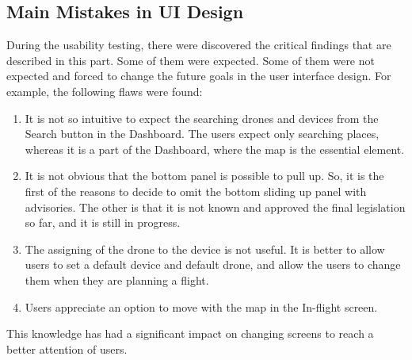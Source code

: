 \subsection{Main Mistakes in UI Design}\label{subsec:main-mistakes-in-ui-design}
During the usability testing, there were discovered the critical findings that are described in this part.
Some of them were expected.
Some of them were not expected and forced to change the future goals in the user interface design.
For example, the following flaws were found:
\begin{enumerate}
    \item It is not so intuitive to expect the searching drones and devices from the Search button in the Dashboard.
    The users expect only searching places, whereas it is a part of the Dashboard, where the map is the essential element.
    \item It is not obvious that the bottom panel is possible to pull up.
    So, it is the first of the reasons to decide to omit the bottom sliding up panel with advisories.
    The other is that it is not known and approved the final legislation so far, and it is still in progress.
    \item The assigning of the drone to the device is not useful.
    It is better to allow users to set a default device and default drone, and allow the users to change them when they are planning a flight.
    \item Users appreciate an option to move with the map in the In-flight screen.
\end{enumerate}
This knowledge has had a significant impact on changing screens to reach a better attention of users.
